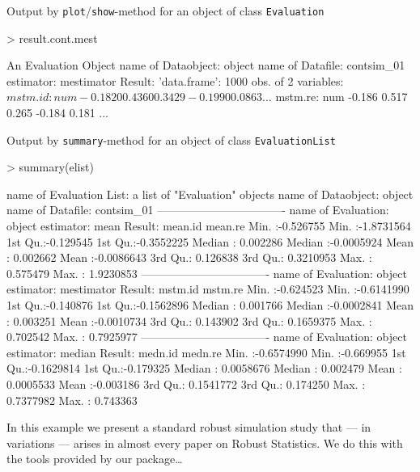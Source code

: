 \documentclass[11pt]{article}
\newcommand{\code}[1]{{\tt #1}}
\begin{document}
\par
\begin{footnotesize}
Output by \code{plot}/\code{show}-method for an object of class \code{Evaluation}
\begin{Schunk}
\begin{Sinput}
> result.cont.mest
\end{Sinput}
\begin{Soutput}
An Evaluation Object
name of Dataobject: object
name of Datafile: contsim_01
estimator: mestimator
Result: 'data.frame':	1000 obs. of  2 variables:
 $ mstm.id: num  -0.1820  0.4360  0.3429 -0.1990  0.0863 ...
 $ mstm.re: num  -0.186  0.517  0.265 -0.184  0.181 ...
\end{Soutput}
\end{Schunk}
\end{footnotesize}
\begin{footnotesize}
Output by \code{summary}-method for an object of class \code{EvaluationList}
\begin{Schunk}
\begin{Sinput}
> summary(elist)
\end{Sinput}
\begin{Soutput}
name of Evaluation List: a list of "Evaluation" objects
name of Dataobject: object
name of Datafile: contsim_01
----------------------------------
name of Evaluation: object
estimator: mean
Result:
    mean.id             mean.re          
 Min.   :-0.526755   Min.   :-1.8731564  
 1st Qu.:-0.129545   1st Qu.:-0.3552225  
 Median : 0.002286   Median :-0.0005924  
 Mean   : 0.002662   Mean   :-0.0086643  
 3rd Qu.: 0.126838   3rd Qu.: 0.3210953  
 Max.   : 0.575479   Max.   : 1.9230853  
----------------------------------
name of Evaluation: object
estimator: mestimator
Result:
    mstm.id             mstm.re          
 Min.   :-0.624523   Min.   :-0.6141990  
 1st Qu.:-0.140876   1st Qu.:-0.1562896  
 Median : 0.001766   Median :-0.0002841  
 Mean   : 0.003251   Mean   :-0.0010734  
 3rd Qu.: 0.143902   3rd Qu.: 0.1659375  
 Max.   : 0.702542   Max.   : 0.7925977  
----------------------------------
name of Evaluation: object
estimator: median
Result:
    medn.id              medn.re         
 Min.   :-0.6574990   Min.   :-0.669955  
 1st Qu.:-0.1629814   1st Qu.:-0.179325  
 Median : 0.0058676   Median : 0.002479  
 Mean   : 0.0005533   Mean   :-0.003186  
 3rd Qu.: 0.1541772   3rd Qu.: 0.174250  
 Max.   : 0.7377982   Max.   : 0.743363  
\end{Soutput}
\end{Schunk}
\end{footnotesize}
\begin{small}
In this example we present a standard robust simulation study that --- in variations --- arises in almost
every paper on Robust Statistics. We do this with the tools provided by our package\ldots
\end{small}
\end{document}
